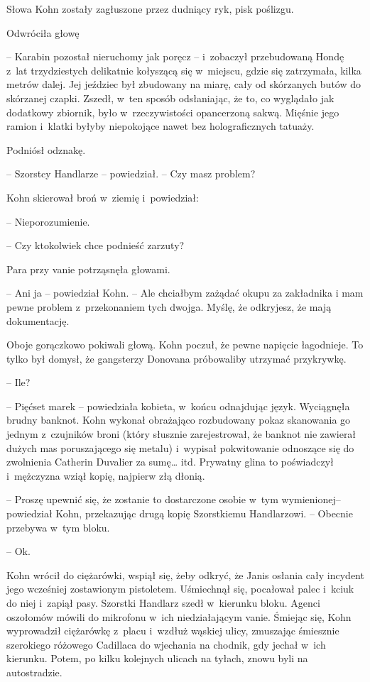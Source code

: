 \documentclass[oneside,polish,11pt,sfheadings]{mwbk}
\begin{document}
Słowa Kohn zostały zagłuszone przez dudniący ryk, pisk poślizgu.

Odwróciła głowę 

-- Karabin pozostał nieruchomy jak poręcz -- i~zobaczył
przebudowaną Hondę z~lat trzydziestych delikatnie kołyszącą się w~miejscu, gdzie się zatrzymała, kilka metrów dalej. Jej jeździec był
zbudowany na miarę, cały od skórzanych butów do skórzanej czapki.
Zszedł, w~ten sposób odsłaniając, że to, co wyglądało jak dodatkowy
zbiornik, było w~rzeczywistości opancerzoną sakwą. Mięśnie jego ramion i~klatki byłyby niepokojące nawet bez holograficznych tatuaży.

Podniósł odznakę. 

-- Szorstcy Handlarze -- powiedział. -- Czy masz problem?

Kohn skierował broń w~ziemię i~powiedział: 

-- Nieporozumienie.

-- Czy ktokolwiek chce podnieść zarzuty?

Para przy vanie potrząsnęła głowami.

-- Ani ja -- powiedział Kohn. -- Ale chciałbym zażądać okupu za zakładnika
i mam pewne problem z~przekonaniem tych dwojga. Myślę, że odkryjesz, że
mają dokumentację.

Oboje gorączkowo pokiwali głową. Kohn poczuł, że pewne napięcie
łagodnieje. To tylko był domysł, że gangsterzy Donovana próbowaliby
utrzymać przykrywkę.

-- Ile?

-- Pięćset marek -- powiedziała kobieta, w~końcu odnajdując język.
Wyciągnęła brudny banknot. Kohn wykonał obrażająco rozbudowany pokaz
skanowania go jednym z~czujników broni (który słusznie zarejestrował, że
banknot nie zawierał dużych mas poruszającego się metalu) i~wypisał
pokwitowanie odnoszące się do zwolnienia Catherin Duvalier za sumę\ldots
itd. Prywatny glina to poświadczył i~mężczyzna wziął kopię, najpierw złą
dłonią.

-- Proszę upewnić się, że zostanie to dostarczone osobie w~tym
wymienionej-- powiedział Kohn, przekazując drugą kopię Szorstkiemu
Handlarzowi. -- Obecnie przebywa w~tym bloku.

-- Ok.

Kohn wrócił do ciężarówki, wspiął się, żeby odkryć, że Janis osłania
cały incydent jego wcześniej zostawionym pistoletem. Uśmiechnął się,
pocałował palec i~kciuk do niej i~zapiął pasy. Szorstki Handlarz szedł w~kierunku bloku. Agenci oszołomów mówili do mikrofonu w~ich
niedziałającym vanie. Śmiejąc się, Kohn wyprowadził ciężarówkę z~placu i~wzdłuż wąskiej ulicy, zmuszając śmiesznie szerokiego różowego Cadillaca
do wjechania na chodnik, gdy jechał w~ich kierunku. Potem, po kilku
kolejnych ulicach na tyłach, znowu byli na autostradzie.
\end{document}
